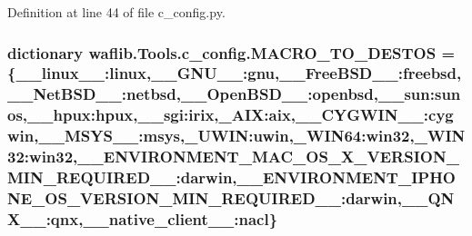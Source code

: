 Definition at line 44 of file c\+\_\+config.\+py.

\subsubsection[{\texorpdfstring{M\+A\+C\+R\+O\+\_\+\+T\+O\+\_\+\+D\+E\+S\+T\+OS}{MACRO_TO_DESTOS}}]{\setlength{\rightskip}{0pt plus 5cm}dictionary waflib.\+Tools.\+c\+\_\+config.\+M\+A\+C\+R\+O\+\_\+\+T\+O\+\_\+\+D\+E\+S\+T\+OS = \{\textquotesingle{}\+\_\+\+\_\+linux\+\_\+\+\_\+\textquotesingle{}\+:\textquotesingle{}linux\textquotesingle{},\textquotesingle{}\+\_\+\+\_\+\+G\+N\+U\+\_\+\+\_\+\textquotesingle{}\+:\textquotesingle{}gnu\textquotesingle{},\textquotesingle{}\+\_\+\+\_\+\+Free\+B\+S\+D\+\_\+\+\_\+\textquotesingle{}\+:\textquotesingle{}freebsd\textquotesingle{},\textquotesingle{}\+\_\+\+\_\+\+Net\+B\+S\+D\+\_\+\+\_\+\textquotesingle{}\+:\textquotesingle{}netbsd\textquotesingle{},\textquotesingle{}\+\_\+\+\_\+\+Open\+B\+S\+D\+\_\+\+\_\+\textquotesingle{}\+:\textquotesingle{}openbsd\textquotesingle{},\textquotesingle{}\+\_\+\+\_\+sun\textquotesingle{}\+:\textquotesingle{}sunos\textquotesingle{},\textquotesingle{}\+\_\+\+\_\+hpux\textquotesingle{}\+:\textquotesingle{}hpux\textquotesingle{},\textquotesingle{}\+\_\+\+\_\+sgi\textquotesingle{}\+:\textquotesingle{}irix\textquotesingle{},\textquotesingle{}\+\_\+\+A\+IX\textquotesingle{}\+:\textquotesingle{}aix\textquotesingle{},\textquotesingle{}\+\_\+\+\_\+\+C\+Y\+G\+W\+I\+N\+\_\+\+\_\+\textquotesingle{}\+:\textquotesingle{}cygwin\textquotesingle{},\textquotesingle{}\+\_\+\+\_\+\+M\+S\+Y\+S\+\_\+\+\_\+\textquotesingle{}\+:\textquotesingle{}msys\textquotesingle{},\textquotesingle{}\+\_\+\+U\+W\+IN\textquotesingle{}\+:\textquotesingle{}uwin\textquotesingle{},\textquotesingle{}\+\_\+\+W\+I\+N64\textquotesingle{}\+:\textquotesingle{}win32\textquotesingle{},\textquotesingle{}\+\_\+\+W\+I\+N32\textquotesingle{}\+:\textquotesingle{}win32\textquotesingle{},\textquotesingle{}\+\_\+\+\_\+\+E\+N\+V\+I\+R\+O\+N\+M\+E\+N\+T\+\_\+\+M\+A\+C\+\_\+\+O\+S\+\_\+\+X\+\_\+\+V\+E\+R\+S\+I\+O\+N\+\_\+\+M\+I\+N\+\_\+\+R\+E\+Q\+U\+I\+R\+E\+D\+\_\+\+\_\+\textquotesingle{}\+:\textquotesingle{}darwin\textquotesingle{},\textquotesingle{}\+\_\+\+\_\+\+E\+N\+V\+I\+R\+O\+N\+M\+E\+N\+T\+\_\+\+I\+P\+H\+O\+N\+E\+\_\+\+O\+S\+\_\+\+V\+E\+R\+S\+I\+O\+N\+\_\+\+M\+I\+N\+\_\+\+R\+E\+Q\+U\+I\+R\+E\+D\+\_\+\+\_\+\textquotesingle{}\+:\textquotesingle{}darwin\textquotesingle{},\textquotesingle{}\+\_\+\+\_\+\+Q\+N\+X\+\_\+\+\_\+\textquotesingle{}\+:\textquotesingle{}qnx\textquotesingle{},\textquotesingle{}\+\_\+\+\_\+native\+\_\+client\+\_\+\+\_\+\textquotesingle{}\+:\textquotesingle{}nacl\textquotesingle{}\}}\hypertarget{namespacewaflib_1_1_tools_1_1c__config_a4fa8f7f8c1a631c0828c7d99729ba544}{}\label{namespacewaflib_1_1_tools_1_1c__config_a4fa8f7f8c1a631c0828c7d99729ba544}


